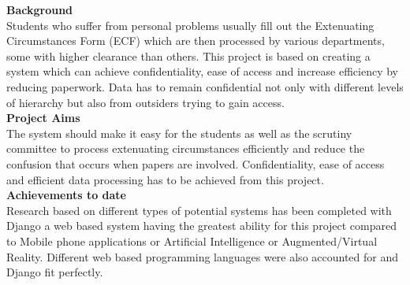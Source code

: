 \documentclass[../main.tex]{subfiles}
\begin{document}
\raggedright
\textbf{{\large Background}} \\[2mm]

Students who suffer from personal problems usually fill out the Extenuating Circumstances Form (ECF) which are then processed by various departments, some with higher clearance than others. This project is based on creating a system which can achieve confidentiality, ease of access and increase efficiency by reducing paperwork. Data has to remain confidential not only with different levels of hierarchy but also from outsiders trying to gain access.  \\[4mm]

\textbf{{\large Project Aims}} \\[2mm]

The system should make it easy for the students as well as the scrutiny committee to process extenuating circumstances efficiently and reduce the confusion that occurs when papers are involved. Confidentiality, ease of access and efficient data processing has to be achieved from this project. \\[4mm]


\textbf{{\large Achievements to date}} \\[2mm]

Research based on different types of potential systems has been completed with Django a web based system having the greatest ability for this project compared to Mobile phone applications or Artificial Intelligence or Augmented/Virtual Reality. Different web based programming languages were also accounted for and Django fit perfectly. \\[4mm]
\end{document}
